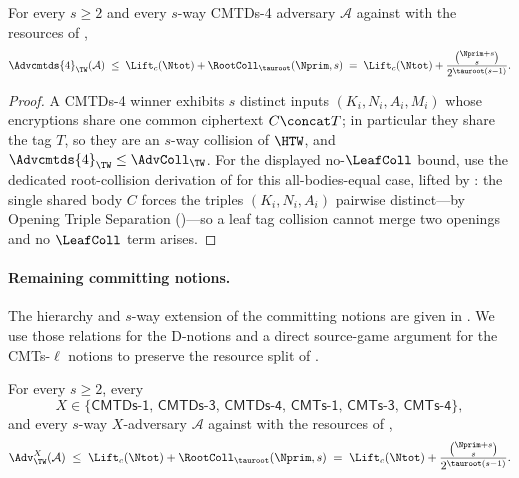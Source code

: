 \begin{corollary}
\label{cor:cmtds4}
For every $s \geq 2$ and every $s$-way CMTDs-4
adversary $\mathcal{A}$ against \TW{} with the resources of
,
\[
  \Advcmtds{4}_\TW(\mathcal{A})
  \;\leq\;
  \Lift_c(\Ntot) + \RootColl_{\tauroot}(\Nprim, s)
  \;=\;
  \Lift_c(\Ntot) + \frac{\binom{\Nprim + s}{s}}{2^{\tauroot (s - 1)}}.
\]
\end{corollary}

\begin{proof}
A CMTDs-4 winner exhibits $s$ distinct inputs $(K_i,N_i,A_i,M_i)$ whose
encryptions share one common ciphertext $C \concat T$; in particular they
share the tag $T$, so they are an $s$-way collision of $\HTW$, and
$\Advcmtds{4}_\TW \leq \AdvColl_\TW$. For the displayed no-$\LeafColl$
bound, use the dedicated root-collision derivation of 
for this all-bodies-equal case, lifted by : the
single shared body $C$ forces the triples $(K_i,N_i,A_i)$ pairwise
distinct---by Opening Triple Separation ()---so a
leaf tag collision cannot merge two openings and no $\LeafColl$ term
arises.
\end{proof}

\paragraph{Remaining committing notions.}
The hierarchy and $s$-way extension of the \cite{BH22} committing notions
are given in \cite[\S3, Figs.~4--5, and App.~A]{BH22}. We use those
relations for the D-notions and a direct source-game argument for the
CMTs-$\ell$ notions to preserve the resource split of
.

\begin{corollary}
\label{cor:committing-combined}
For every $s \geq 2$, every
\[
  X \in \bigl\{\mathsf{CMTDs\text{-}1},\, \mathsf{CMTDs\text{-}3},\,
              \mathsf{CMTDs\text{-}4},\, \mathsf{CMTs\text{-}1},\,
              \mathsf{CMTs\text{-}3},\, \mathsf{CMTs\text{-}4}\bigr\},
\]
and every $s$-way $X$-adversary $\mathcal{A}$ against \TW{} with the
resources of ,
\[
  \Adv^X_\TW(\mathcal{A})
  \;\leq\;
  \Lift_c(\Ntot) + \RootColl_{\tauroot}(\Nprim, s)
  \;=\;
  \Lift_c(\Ntot) + \frac{\binom{\Nprim + s}{s}}{2^{\tauroot(s-1)}}.
\]
\end{corollary}

